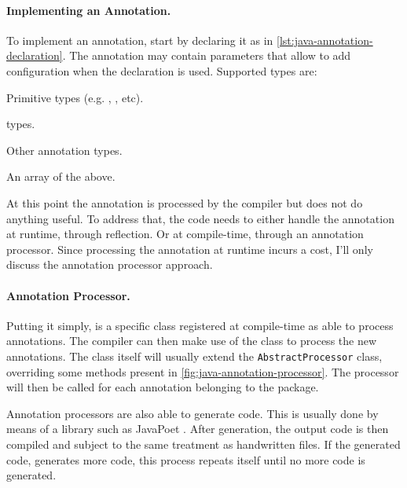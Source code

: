 





\paragraph{Implementing an Annotation.}
To implement an annotation, start by declaring it as in \autoref{lst:java-annotation-declaration}.
The annotation may contain parameters that allow to add configuration when the declaration is used.
Supported types are:
\begin{compactitem}
	\item Primitive types (e.g. , , etc).
	\item {}
	\item {}
	\item {} types.
	\item Other annotation types.
	\item An array of the above.
\end{compactitem}
At this point the annotation is processed by the compiler but does not do anything useful.
To address that, the code needs to either handle the annotation at runtime, through reflection.
Or at compile-time, through an annotation processor.
Since processing the annotation at runtime incurs a cost, I'll only discuss the annotation processor approach.

\paragraph{Annotation Processor.}
Putting it simply, is a specific class registered at compile-time as able to process annotations.
The compiler can then make use of the class to process the new annotations.
The class itself will usually extend the \texttt{AbstractProcessor} class,
overriding some methods present in \autoref{fig:java-annotation-processor}.
The processor will then be called for each annotation belonging to the package.

Annotation processors are also able to generate code.
This is usually done by means of a library such as JavaPoet \autocite{Square2021}.
After generation, the output code is then compiled and subject to the same treatment as handwritten files.
If the generated code, generates more code, this process repeats itself until no more code is generated.

